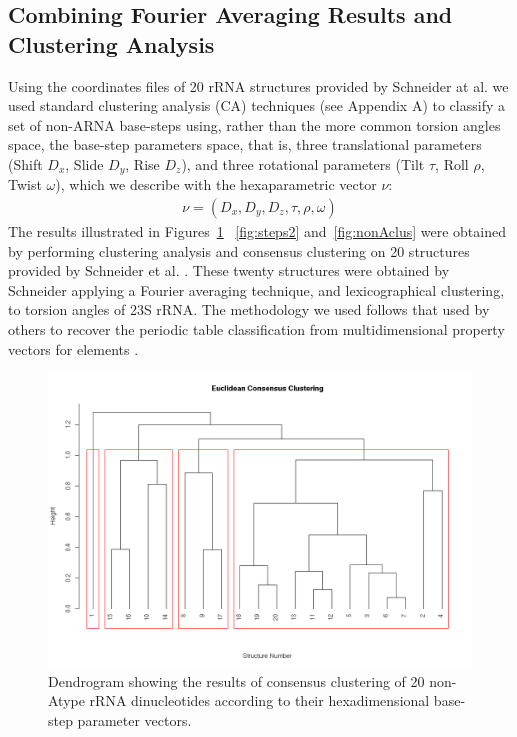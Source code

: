 \subsection{Combining Fourier Averaging Results and Clustering Analysis}
Using  the  coordinates  files  of  20  rRNA  structures  provided  by
Schneider at al.\cite{schneider2004}  we used standard clustering
analysis  (CA)  techniques (see  Appendix  A)  to  classify a  set  of
non-ARNA  base-steps  using, rather  than  the more common torsion
angles  space,   the  base-step  parameters  space,   that  is,  three
translational parameters (Shift $D_x$, Slide $D_y$, Rise $D_z$), and
three rotational parameters (Tilt $\tau$, Roll $\rho$, Twist $\omega$),
which we describe with the hexaparametric vector $\nu$:
\begin{gather}
 \nu = (D_x, D_y, D_z, \tau, \rho, \omega)
\end{gather}
The results illustrated in Figures~\ref{fig:eucl_cons} ~\ref{fig:steps2}
and~\ref{fig:nonAclus} were obtained by performing clustering analysis
and consensus clustering on 20 structures provided by Schneider et al.
\cite{schneider2004}.   These  twenty   structures  were  obtained  by
Schneider applying a  Fourier averaging technique, and lexicographical
clustering, to  torsion angles of  23S rRNA.  The methodology  we used
follows   that  used  by   others  to   recover  the   periodic  table
classification  from multidimensional  property  vectors for  elements
\cite{restrepo2004, restrepo2006}.
\begin{figure}[htbp]
 \centering
\includegraphics[angle=90, scale=0.6]{Chapter2/eucli_cons_nonA-RNA.png}
\caption{Dendrogram showing the results  of consensus clustering of 20
non-Atype  rRNA  dinucleotides   according  to  their  hexadimensional
base-step parameter vectors.}
 \label{fig:eucl_cons}
\end{figure}

